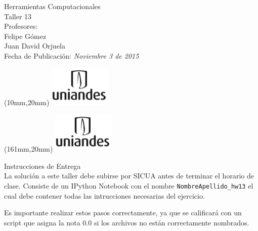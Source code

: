 \documentclass[11pt,letterpaper]{exam}
\begin{document}
\begin{center}
{\Large Herramientas Computacionales \\
 Taller 13}\\
Profesores: \\ Felipe G\'omez\\ Juan David Orjuela \\
Fecha de Publicación: {\small \it Noviembre 3 de 2015}\\
\end{center}

\begin{textblock*}{40mm}(10mm,20mm)
  \includegraphics[width=3cm]{logoUniandes.png}
\end{textblock*}

\begin{textblock*}{40mm}(161mm,20mm)
  \includegraphics[width=3cm]{logoUniandes.png}
\end{textblock*}

\vspace{0.5cm}

{\Large Instrucciones de Entrega}\\

\noindent
La solución a este taller debe subirse por SICUA antes de terminar 
el horario de clase.
\noindent
Consiste de un IPython Notebook con el nombre
\verb"NombreApellido_hw13"
el cual debe contener todas las intrucciones necesarias del ejercicio.

Es importante realizar estos pasos correctamente, ya que se calificará con un
script que asigna la nota 0.0 si los archivos no están correctamente nombrados.
\end{document}
